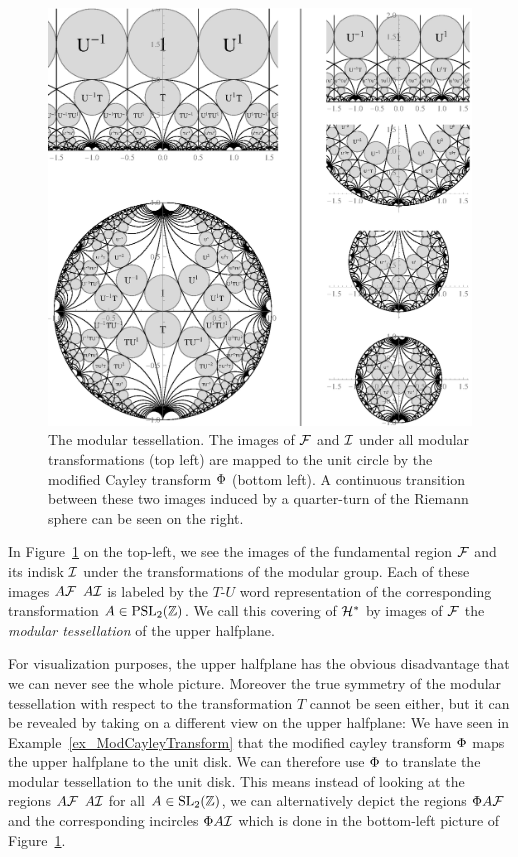 \begin{figure}
\centering
\includegraphics[width=\textwidth]{figures/modular-tiling-1}
\caption{The modular tessellation. The images of $\mathcal{F}$ and $\mathcal{I}$ under all modular transformations (top left) are mapped to the unit circle by the modified Cayley transform $\Phi$ (bottom left). A continuous transition between these two images induced by a quarter-turn of the Riemann sphere can be seen on the right.}
\label{fig_ModularTiling}
\end{figure}
In Figure~\ref{fig_ModularTiling} on the top-left, we see the images of the fundamental region $\mathcal{F}$ and its indisk $\mathcal{I}$ under the transformations of the modular group. Each of these images $A \mathcal{F}$ \resp $A \mathcal{I}$ is labeled by the $T$-$U$ word representation of the corresponding transformation $A \in \operatorname{PSL}_{2}(\mathbb{Z})$. We call this covering of $\mathcal{H}^\ast$ by images of $\mathcal{F}$ the \emph{modular tessellation} of the upper halfplane.

For visualization purposes, the upper halfplane has the obvious disadvantage that we can never see the whole picture. Moreover the true symmetry of the modular tessellation with respect to the transformation $T$ cannot be seen either, but it can be revealed by taking on a different view on the upper halfplane: We have seen in Example~\ref{ex_ModCayleyTransform} that the modified cayley transform $\Phi$ maps the upper halfplane to the unit disk. We can therefore use $\Phi$ to translate the modular tessellation to the unit disk. This means instead of looking at the regions $A \mathcal{F}$ \resp $A \mathcal{I}$ for all $A \in \operatorname{SL}_{2}(\mathbb{Z})$, we can alternatively depict the regions $\Phi A \mathcal{F}$ and the corresponding incircles $\Phi A \mathcal{I}$ which is done in the bottom-left picture of Figure~\ref{fig_ModularTiling}. 

